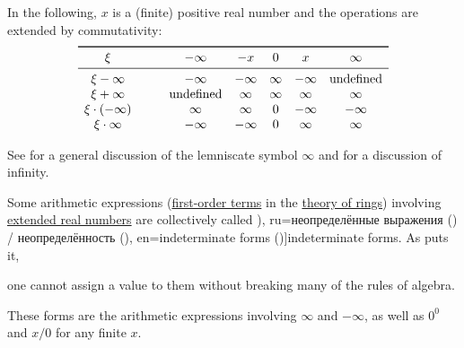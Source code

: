 \begin{definition}
  In the following, \( x \) is a (finite) positive real number and the operations are extended by commutativity:
  \begin{equation*}
    \begin{array}{c !{\qquad} *{5}{c}}
      \toprule
      \xi                 & -\infty       & -x      & 0      & x       & \infty        \\
      \midrule
      \xi - \infty        & -\infty       & -\infty & \infty & -\infty & \T{undefined} \\
      \xi + \infty        & \T{undefined} & \infty  & \infty & \infty  & \infty \\
      \xi \cdot (-\infty) & \infty        & \infty  & 0      & -\infty & -\infty \\
      \xi \cdot \infty    & -\infty       & -\infty & 0      & \infty  & \infty \\
    \end{array}
  \end{equation*}
\end{definition}
\begin{comments}
  \item See  for a general discussion of the lemniscate symbol \( \infty \) and  for a discussion of infinity.
\end{comments}

\begin{definition}\label{def:indeterminate_form}\mimprovised
  Some arithmetic expressions (\hyperref[def:first_order_syntax/term]{first-order terms} in the \hyperref[def:ring/theory]{theory of rings}) involving \hyperref[def:extended_real_numbers]{extended real numbers} are collectively called \term[bg=неопределености (\cite[228]{ИлинСадовничиСендов1984АнализТом1}), ru=неопределённые выражения (\cite[\S 41]{Фихтенгольц1968ОсновыАнализаТом1}) / неопределённость (\cite[235]{ИльинСадовничийСендов1985АнализТом1}), en=indeterminate forms (\cite[12]{Tao2011MeasureTheory})]{indeterminate forms}. As  puts it,
  \begin{displayquote}
    \textellipsis one cannot assign a value to them without breaking many of the rules of algebra.
  \end{displayquote}

  These forms are the arithmetic expressions involving \( \infty \) and \( -\infty \), as well as \( 0^0 \) and \( x / 0 \) for any finite \( x \).
\end{definition}

